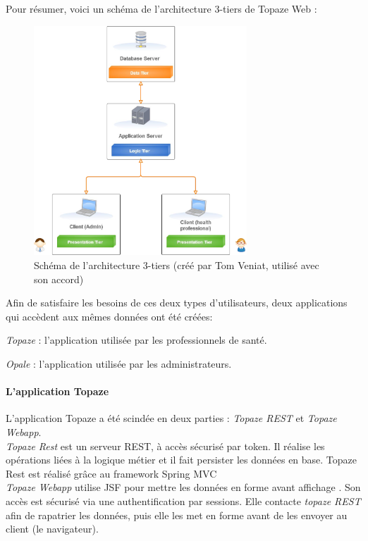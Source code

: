 Pour résumer, voici un schéma de l'architecture 3-tiers de Topaze Web :
\begin{figure}[H]
	\vspace{-10pt}
  \centering
  \includegraphics[width=8cm]{./img/architecture1}
  \caption{\label{fig:mb_va_ast} Schéma de l'architecture 3-tiers (créé par Tom Veniat, utilisé avec son accord)}
\end{figure}

Afin de satisfaire les besoins de ces deux types d'utilisateurs, deux applications qui accèdent aux mêmes données ont été créées: 

\begin{sitemize}
\item \textit{Topaze} : l'application utilisée par les professionnels de santé. 
\item \textit{Opale} : l'application utilisée par les administrateurs.
\end{sitemize}

\paragraph*{L'application Topaze\\}
L'application Topaze a été scindée en deux parties : \textit{Topaze REST} et \textit{Topaze Webapp}.\\
\textit{Topaze Rest} est un serveur REST, à accès sécurisé par token. Il réalise les opérations liées à la logique métier et il fait persister les données en base. Topaze Rest est réalisé grâce au framework Spring MVC \cite{bib:spring}\\
\textit{Topaze Webapp} utilise JSF pour mettre les données en forme avant affichage \cite{bib:jsf}. Son accès est sécurisé via une authentification par sessions. Elle contacte \textit{topaze REST} afin de rapatrier les données, puis elle les met en forme avant de les envoyer au client (le navigateur).

